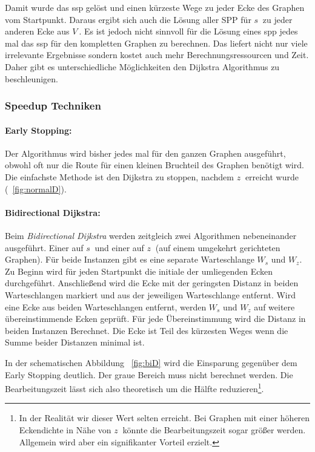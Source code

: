 Damit wurde das \gls{ssp} gelöst und einen kürzeste Wege zu jeder Ecke des Graphen vom Startpunkt.
Daraus ergibt sich auch die Lösung aller SPP für $s~$ zu jeder anderen Ecke aus $V~$.
Es ist jedoch nicht sinnvoll für die Lösung eines \gls{spp} jedes mal das \gls{ssp} für den kompletten Graphen zu berechnen.
Das liefert nicht nur viele irrelevante Ergebnisse sondern kostet auch mehr Berechnungsressourcen und Zeit.
Daher gibt es unterschiedliche Möglichkeiten den Dijkstra Algorithmus zu beschleunigen.

\subsubsection{Speedup Techniken}

\paragraph*{Early Stopping:}
Der Algorithmus wird bisher jedes mal für den ganzen Graphen ausgeführt, obwohl oft nur die Route für einen kleinen Bruchteil des Graphen benötigt wird.
Die einfachste Methode ist den Dijkstra zu stoppen, nachdem $z~$ erreicht wurde (~\ref{fig:normalD}).

\paragraph*{Bidirectional Dijkstra:}
Beim \textit{Bidirectional Dijkstra} werden zeitgleich zwei Algorithmen nebeneinander ausgeführt.
Einer auf $s~$ und einer auf $z~$ (auf einem umgekehrt gerichteten Graphen).
Für beide Instanzen gibt es eine separate Warteschlange $W_{s}$ und $W_{z}$.
Zu Beginn wird für jeden Startpunkt die initiale der umliegenden Ecken durchgeführt.
Anschließend wird die Ecke mit der geringsten Distanz in beiden Warteschlangen markiert und aus der jeweiligen Warteschlange entfernt.
Wird eine Ecke aus beiden Warteschlangen entfernt, werden $W_{s}$ und $W_{z}$ auf weitere übereinstimmende Ecken geprüft.
Für jede Übereinstimmung wird die Distanz in beiden Instanzen Berechnet.
Die Ecke ist Teil des kürzesten Weges wenn die Summe beider Distanzen minimal ist.\par
In der schematischen Abbildung ~\ref{fig:biD} wird die Einsparung gegenüber dem Early Stopping deutlich.
Der graue Bereich muss nicht berechnet werden.
Die Bearbeitungszeit lässt sich also theoretisch um die Hälfte reduzieren\footnote{In der Realität wir dieser Wert selten erreicht.
Bei Graphen mit einer höheren Eckendichte in Nähe von $z~$ könnte die Bearbeitungszeit sogar größer werden.
Allgemein wird aber ein signifikanter Vorteil erzielt.}.

